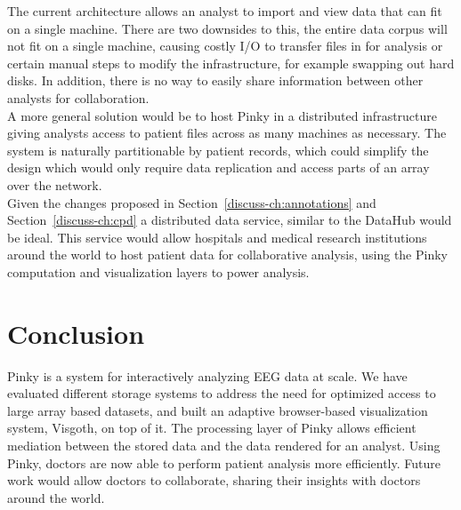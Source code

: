 The current architecture allows an analyst to import and view data that can fit
on a single machine. There are two downsides to this, the entire data
corpus will not fit on a single machine, causing costly I/O to
transfer files in for analysis or certain manual steps to modify the
infrastructure, for example swapping out hard disks. In addition, there is no
way to easily share information between other analysts for collaboration. \\

A more general solution would be to host Pinky in a distributed infrastructure
giving analysts access to patient files across as many machines as necessary.
The system is naturally partitionable by patient records, which could simplify
the design which would only require data replication and access parts of
an array over the network. \\

Given the changes proposed in Section~\ref{discuss-ch:annotations} and
Section~\ref{discuss-ch:cpd} a distributed data service, similar to the
DataHub \cite{datahub} would be ideal. This service would allow hospitals and
medical research institutions around the world to host patient data for
collaborative analysis, using the Pinky computation and visualization layers to
power analysis.

\section{Conclusion}

Pinky is a system for interactively analyzing EEG data at scale. We have
evaluated different storage systems to address the need for optimized access to
large array based datasets, and built an adaptive browser-based visualization
system, Visgoth, on top of it. The processing layer of Pinky allows efficient
mediation between the stored data and the data rendered for an analyst. Using
Pinky, doctors are now able to perform patient analysis more efficiently.
Future work would allow doctors to collaborate, sharing their insights with
doctors around the world.

